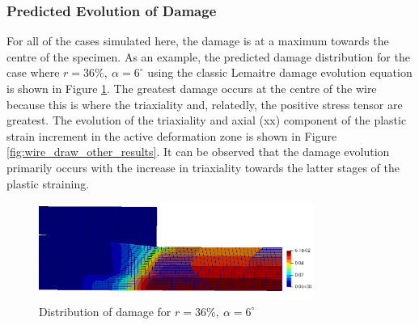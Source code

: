 \documentclass[sn-mathphys,Numbered]{sn-jnl}%
\begin{document}
\subsubsection{Predicted Evolution of Damage}
For all of the cases simulated here, the damage is at a maximum towards the centre of the specimen.
As an example, the predicted damage distribution for the case where $r=36\%,\ \alpha=6^{\circ}$ using the classic Lemaitre damage evolution equation is shown in Figure \ref{fig:wire_draw_damage_lemaitre}.
The greatest damage occurs at the centre of the wire because this is where the triaxiality and, relatedly, the positive stress tensor are greatest.
The evolution of the triaxiality and axial (xx) component of the plastic strain increment in the active deformation zone is shown in Figure \ref{fig:wire_draw_other_results}.
It can be observed that the damage evolution primarily occurs with the increase in triaxiality towards the latter stages of the plastic straining.
\begin{figure}[htb]
\begin{center}
	\includegraphics[width=0.8\textwidth]{./Figures/SimulationAndAnalysis/compare36_12/36_6Damage2.png}
	\caption{Distribution of damage for $r=36\%,\ \alpha=6^{\circ}$}
	\label{fig:wire_draw_damage_lemaitre}
\end{center}
\end{figure}
\end{document}
